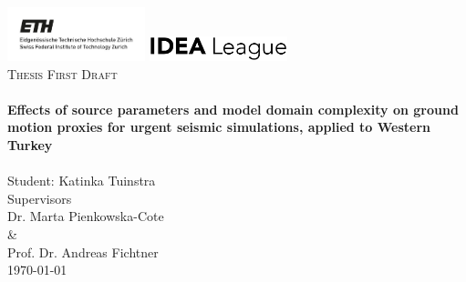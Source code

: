 \begin{titlepage}

\includegraphics[width=0.3\textwidth]{images_overall/logo.jpg} \qquad \qquad \qquad \qquad \qquad \qquad \qquad
\includegraphics[width=0.3\textwidth]{images_overall/IDEA_League_Logo.png}\\[2 cm]

\center 
\textsc{\Large Thesis First Draft}\\[0.2cm]
\HRule \\[0.8cm]
{ \Large \bfseries Effects of source parameters and model domain complexity on ground motion proxies for urgent seismic simulations, applied to Western Turkey}\\[0.8cm]
\HRule \\[1cm]



Student:
Katinka Tuinstra \\[1.5cm]

Supervisors  \\
Dr. Marta Pienkowska-Cote\\
\& \\
Prof. Dr. Andreas Fichtner \\ [1cm]

{\large \today} \\[5cm]


 	
\vfill 

\end{titlepage}